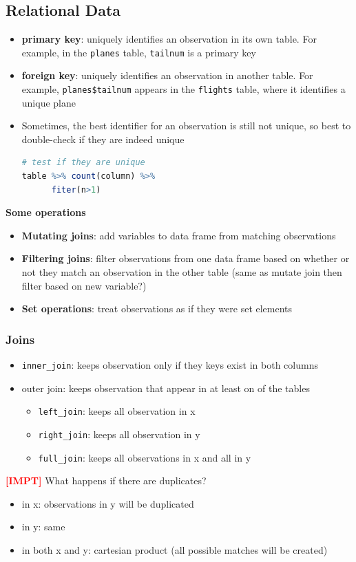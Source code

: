 \documentclass{article}
\newcommand{\impt}[0]{\textcolor{red}{\textbf{[IMPT] }}}
\begin{document}
\begin{multicols}{2}
\subsection{Relational Data}

\begin{itemize}
	\item \textbf{primary key}: uniquely identifies an observation in its own table. For example, in the \texttt{planes} table, \texttt{tailnum} is a primary key
	\item \textbf{foreign key}: uniquely identifies an observation in another table. For example, \texttt{planes\$tailnum} appears in the \texttt{flights} table, where it identifies a unique plane
	\item Sometimes, the best identifier for an observation is still not unique, so best to double-check if they are indeed unique
	\begin{lstlisting}[language=R]
# test if they are unique
table %>% count(column) %>%
      fiter(n>1)\end{lstlisting}
\end{itemize}

\textbf{Some operations}
\begin{itemize}
	\item \textbf{Mutating joins}: add variables to data frame from matching observations
	\item \textbf{Filtering joins}: filter observations from one data frame based on whether or not they match an observation in the other table (same as mutate join then filter based on new variable?)
	\item \textbf{Set operations}: treat observations as if they were set elements
\end{itemize}
\subsubsection{Joins}
\begin{itemize}
	\item \texttt{inner\_join}: keeps observation only if they keys exist in both columns
	\item outer join: keeps observation that appear in at least on of the tables
	\begin{itemize}
		\item \texttt{left\_join}: keeps all observation in x
		\item \texttt{right\_join}: keeps all observation in y
		\item \texttt{full\_join}: keeps all observations in x and all in y
	\end{itemize}
\end{itemize}
\impt What happens if there are duplicates?
\begin{itemize}
	\item in x: observations in y will be duplicated
	\item in y: same
	\item in both x and y: cartesian product (all possible matches will be created)
\end{itemize}

\end{multicols}
\end{document}
